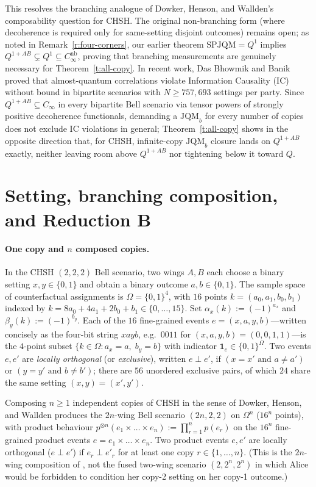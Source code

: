 \documentclass[11pt,a4paper]{article}
\theoremstyle{definition}
\theoremstyle{remark}
\newcommand{\ind}[1]{\mathbf{1}_{#1}}
\newcommand{\JQMb}{\mathrm{JQM}_b}
\newcommand{\QAB}{Q^{1+AB}}
\begin{document}
This resolves the branching analogue of Dowker, Henson, and Wallden's composability question for CHSH. The original non-branching form (where decoherence is required only for same-setting disjoint outcomes) remains open; as noted in Remark~\ref{r:four-corners}, our earlier theorem $\mathrm{SPJQM} = Q^1$ \cite{SPJQM} implies $\QAB \subsetneq Q^1 \subseteq C_\infty^{\mathrm{nb}}$, proving that branching measurements are genuinely necessary for Theorem~\ref{t:all-copy}. In recent work, Das Bhowmik and Banik \cite{DBB} proved that almost-quantum correlations violate Information Causality (IC) without bound in bipartite scenarios with $N \ge 757{,}693$ settings per party. Since $\QAB \subseteq C_\infty$ in every bipartite Bell scenario via tensor powers of strongly positive decoherence functionals, demanding a $\JQMb$ for every number of copies does not exclude IC violations in general; Theorem~\ref{t:all-copy} shows in the opposite direction that, for CHSH, infinite-copy $\JQMb$ closure lands on $\QAB$ exactly, neither leaving room above $\QAB$ nor tightening below it toward $Q$.

\section{Setting, branching composition, and Reduction B}\label{s:setting}

\paragraph{One copy and $n$ composed copies.}
In the CHSH $(2,2,2)$ Bell scenario, two wings $A, B$ each choose a binary setting $x, y \in \{0,1\}$ and obtain a binary outcome $a, b \in \{0,1\}$. The sample space of counterfactual assignments is $\Omega = \{0,1\}^4$, with $16$ points $k = (a_0, a_1, b_0, b_1)$ indexed by $k = 8a_0 + 4a_1 + 2b_0 + b_1 \in \{0,\dots,15\}$. Set $\alpha_x(k) := (-1)^{a_x}$ and $\beta_y(k) := (-1)^{b_y}$. Each of the $16$ fine-grained events $e = (x, a, y, b)$---written concisely as the four-bit string $xayb$, e.g.\ $0011$ for $(x,a,y,b) = (0,0,1,1)$---is the $4$-point subset $\{k \in \Omega : a_x = a,\; b_y = b\}$ with indicator $\ind e \in \{0,1\}^\Omega$. Two events $e, e'$ are \emph{locally orthogonal} (or \emph{exclusive}), written $e \perp e'$, if $(x = x' \text{ and } a \neq a')$ or $(y = y' \text{ and } b \neq b')$; there are $56$ unordered exclusive pairs, of which $24$ share the same setting $(x,y) = (x',y')$.

Composing $n \ge 1$ independent copies of CHSH in the sense of Dowker, Henson, and Wallden \cite[Sec.~2]{DHW} produces the $2n$-wing Bell scenario $(2n, 2, 2)$ on $\Omega^n$ ($16^n$ points), with product behaviour $p^{\otimes n}(e_1 \times \dots \times e_n) := \prod_{r=1}^n p(e_r)$ on the $16^n$ fine-grained product events $e = e_1 \times \dots \times e_n$. Two product events $e, e'$ are locally orthogonal ($e \perp e'$) if $e_r \perp e'_r$ for at least one copy $r \in \{1,\dots,n\}$. (This is the $2n$-wing composition of \cite{DHW}, not the fused two-wing scenario $(2, 2^n, 2^n)$ in which Alice would be forbidden to condition her copy-2 setting on her copy-1 outcome.)
\end{document}
